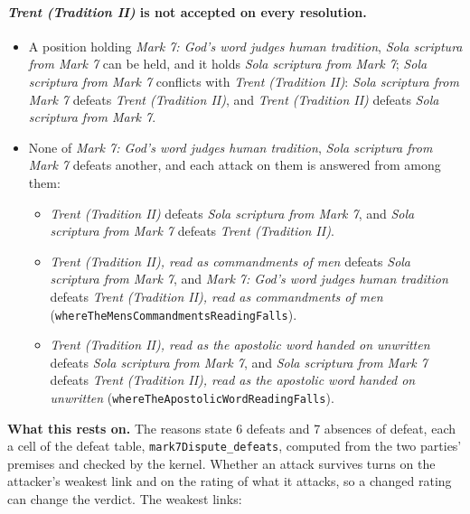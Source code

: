 \documentclass[11pt]{article}
\begin{document}
\paragraph{\emph{Trent (Tradition II)} is not accepted on every resolution.}
\begin{itemize}
\item A position holding \emph{Mark 7: God’s word judges human tradition}, \emph{Sola scriptura from Mark 7} can be held, and it holds \emph{Sola scriptura from Mark 7}; \emph{Sola scriptura from Mark 7} conflicts with \emph{Trent (Tradition II)}: \emph{Sola scriptura from Mark 7} defeats \emph{Trent (Tradition II)}, and \emph{Trent (Tradition II)} defeats \emph{Sola scriptura from Mark 7}.
\item None of \emph{Mark 7: God’s word judges human tradition}, \emph{Sola scriptura from Mark 7} defeats another, and each attack on them is answered from among them:
\begin{itemize}
\item \emph{Trent (Tradition II)} defeats \emph{Sola scriptura from Mark 7}, and \emph{Sola scriptura from Mark 7} defeats \emph{Trent (Tradition II)}.
\item \emph{Trent (Tradition II), read as commandments of men} defeats \emph{Sola scriptura from Mark 7}, and \emph{Mark 7: God’s word judges human tradition} defeats \emph{Trent (Tradition II), read as commandments of men} (\texttt{where\allowbreak{}The\allowbreak{}Mens\allowbreak{}Commandments\allowbreak{}Reading\allowbreak{}Falls}).
\item \emph{Trent (Tradition II), read as the apostolic word handed on unwritten} defeats \emph{Sola scriptura from Mark 7}, and \emph{Sola scriptura from Mark 7} defeats \emph{Trent (Tradition II), read as the apostolic word handed on unwritten} (\texttt{where\allowbreak{}The\allowbreak{}Apostolic\allowbreak{}Word\allowbreak{}Reading\allowbreak{}Falls}).
\end{itemize}
\end{itemize}
\par\noindent\textbf{What this rests on.} The reasons state 6 defeats and 7 absences of defeat, each a cell of the defeat table, \texttt{mark7\allowbreak{}Dispute\_\allowbreak{}defeats}, computed from the two parties' premises and checked by the kernel. Whether an attack survives turns on the attacker's weakest link and on the rating of what it attacks, so a changed rating can change the verdict. The weakest links:
\end{document}
